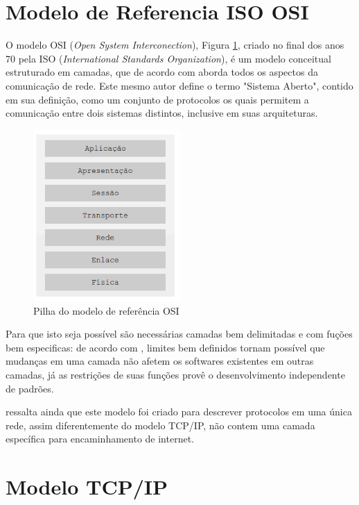 	 
\section{Modelo de Referencia ISO OSI}

O modelo OSI (\textit{Open System Interconection}), Figura \ref{fig:OSI}, criado no final dos anos 70 pela ISO (\textit{International Standards Organization}), é um modelo conceitual estruturado em camadas, que de acordo com  aborda todos os aspectos da comunicação de rede. Este mesmo autor define o termo "Sistema Aberto", contido em sua definição, como um conjunto de protocolos os quais permitem a comunicação entre dois sistemas distintos, inclusive em suas arquiteturas. 

\begin{figure}[H]
	\centering
    \includegraphics[width=0.5\textwidth]{04-figuras/OSI.png}
    \caption{Pilha do modelo de referência OSI}
    \label{fig:OSI}
\end{figure} 


Para que isto seja possível são necessárias camadas bem delimitadas e com fuç\~oes bem especificas: de acordo com , limites bem definidos tornam possível que mudanças em uma camada não afetem os softwares existentes em outras camadas, já as restrições de suas funções provê o desenvolvimento independente de padrões.

 ressalta ainda que este modelo foi criado para descrever protocolos em uma única rede, assim diferentemente do modelo TCP/IP, não contem uma camada específica para encaminhamento de internet.



\section{Modelo TCP/IP}

